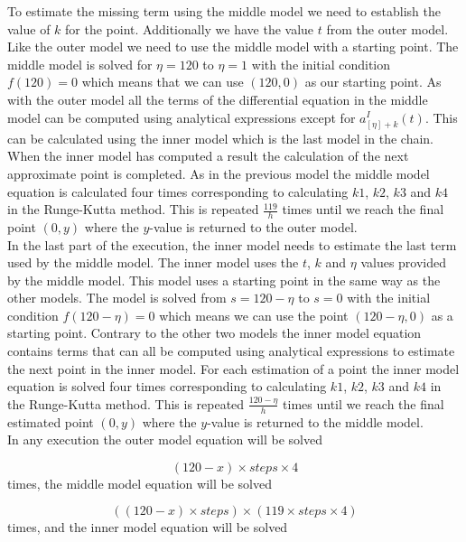 	To estimate the missing term using the middle model we need to establish the value of $k$ for the point. Additionally we have the value $t$ from the outer model. Like the outer model we need to use the middle model with a starting point. The middle model is solved for $\eta = 120$ to $\eta = 1$ with the initial condition $f(120) = 0$ which means that we can use $(120,0)$ as our starting point. As with the outer model all the terms of the differential equation in the middle model can be computed using analytical expressions except for $a_{[\eta]+k}^I(t)$. This can be calculated using the inner model which is the last model in the chain. When the inner model has computed a result the calculation of the next approximate point is completed. As in the previous model the middle model equation is calculated four times corresponding to calculating $k1$, $k2$, $k3$ and $k4$ in the Runge-Kutta method. This is repeated $\frac{119}{h}$ times until we reach the final point $(0,y)$ where the $y$-value is returned to the outer model. \\
	
	In the last part of the execution, the inner model needs to estimate the last term used by the middle model. The inner model uses the $t$, $k$ and $\eta$ values provided by the middle model. This model uses a starting point in the same way as the other models. The model is solved from $s = 120 - \eta$ to $s=0$ with the initial condition $f(120 - \eta) = 0$ which means we can use the point $(120-\eta,0)$ as a starting point. Contrary to the other two models the inner model equation contains terms that can all be computed using analytical expressions to estimate the next point in the inner model. For each estimation of a point the inner model equation is solved four times corresponding to calculating $k1$, $k2$, $k3$ and $k4$ in the Runge-Kutta method. This is repeated $\frac{120 - \eta}{h}$ times until we reach the final estimated point $(0,y)$ where the $y$-value is returned to the middle model. \\ 
	
	\noindent In any execution the outer model equation will be solved 
	
	\begin{equation}
	(120-x) \times steps \times 4
	\end{equation} times, the middle model equation will be solved 
	
	\begin{equation}
	((120-x) \times steps) \times (119 \times steps \times 4)
	\end{equation} times, and the inner model equation will be solved 
	
